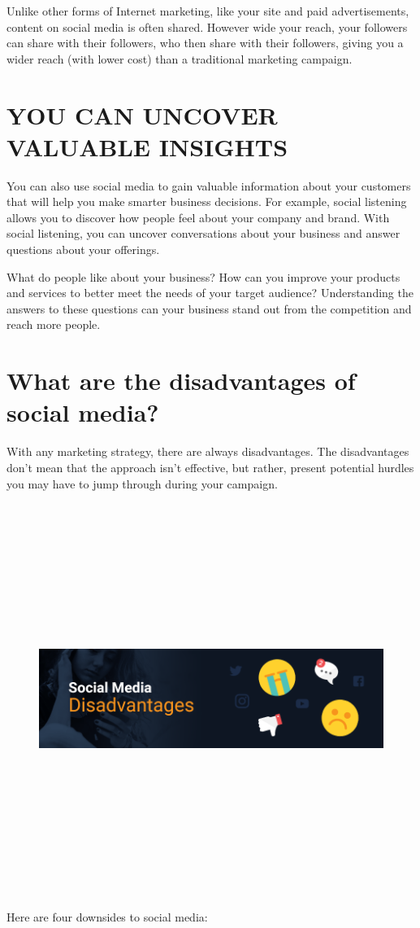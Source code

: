 \documentclass[a4paper]{article}
\begin{document}
Unlike other forms of Internet marketing, like your site and paid advertisements, content on social media is often shared. However wide your reach, your followers can share with their followers, who then share with their followers, giving you a wider reach (with lower cost) than a traditional marketing campaign.
  \newpage
  \section{YOU CAN UNCOVER VALUABLE INSIGHTS}
 You can also use social media to gain valuable information about your customers that will help you make smarter business decisions. For example, social listening allows you to discover how people feel about your company and brand. With social listening, you can uncover conversations about your business and answer questions about your offerings.

What do people like about your business? How can you improve your products and services to better meet the needs of your target audience? Understanding the answers to these questions can your business stand out from the competition and reach more people.
 \section{What are the disadvantages of social media?}
With any marketing strategy, there are always disadvantages. The disadvantages don’t mean that the approach isn’t effective, but rather, present potential hurdles you may have to jump through during your campaign.
\begin{figure}[h]
\centering
\includegraphics[width=5in,height=5in]{sab}
\caption{}
\end{figure}
Here are four downsides to social media:
\end{document}
